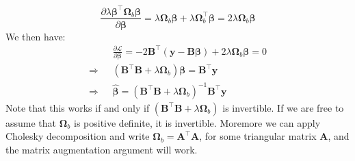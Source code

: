 \documentclass[11pt]{article}
\begin{document}
$$
\frac{\partial \lambda \bm{\beta}^{\top} \bm{\Omega}_{b} \bm{\beta}}{\partial \bm{\beta}} = \lambda \bm{\Omega}_b \bm{\beta} + \lambda \bm{\Omega}_b^{\top} \bm{\beta} = 2\lambda \bm{\Omega}_b \bm{\beta}
$$
We then have:
\begin{equation}
    \begin{split}
        &\frac{\partial \mathcal{L}}{\partial \bm{\beta}} = -2 \bm{B}^{\top}(\bm{y}-\bm{B\beta}) + 2\lambda \bm{\Omega}_b \bm{\beta} = 0\\
        \Rightarrow ~~~& (\bm{B}^{\top} \bm{B} + \lambda \bm{\Omega}_b)\bm{\beta} =  \bm{B}^{\top} \bm{y} \\
        \Rightarrow~~~&\hat{\bm{\beta}} = ( \bm{B}^{\top} \bm{B} + \lambda \bm{\Omega}_b)^{-1} \bm{B}^{\top} \bm{y}
    \end{split}
\end{equation}
Note that this works if and only if $(\bm{B}^{\top} \bm{B} + \lambda \bm{\Omega}_b)$ is invertible. If we are free to assume that $\bm{\Omega}_b$ is positive definite, it is invertible. Moremore we can apply Cholesky decomposition and write $\bm{\Omega}_b = \bm{A}^{\top} \bm{A}$, for some triangular matrix $\bm{A}$, and the matrix augmentation argument will work.


    
    
    
    
\end{document}
